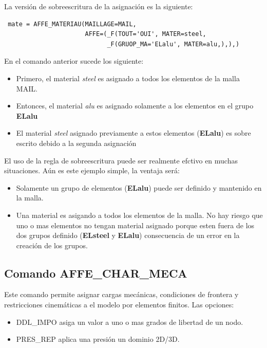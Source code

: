 \documentclass[12pt]{book}
\theoremstyle{definition}
\theoremstyle{remark}
\theoremstyle{plain}
\begin{document}
La versión de sobreescritura de la asignación es la siguiente:

\begin{verbatim}
 mate = AFFE_MATERIAU(MAILLAGE=MAIL, 
                      AFFE=(_F(TOUT='OUI', MATER=steel,
                            _F(GRUOP_MA='ELalu', MATER=alu,),),)
\end{verbatim}

En el comando anterior sucede los siguiente:

\begin{itemize}
 \item Primero, el material \textit{steel} es asignado a todos los elementos de 
la malla MAIL.
 \item Entonces, el material \textit{alu} es asignado solamente a los elementos
en el grupo \textbf{ELalu}
 \item El material \textit{steel} asignado previamente a estos elementos
(\textbf{ELalu}) es sobre escrito debido a la segunda asignación
\end{itemize}

El uso de la regla de sobreescritura puede ser realmente efctivo en muchas 
situaciones. Aún es este ejemplo simple, la ventaja será:

\begin{itemize}
 \item Solamente un grupo de elementos (\textbf{ELalu}) puede ser definido
y mantenido en la malla.
 \item Una material es asigando a todos los elementos de la malla. No hay
riesgo que uno o mas elementos no tengan material asignado porque esten fuera de los
dos grupos definido (\textbf{ELsteel} y \textbf{ELalu}) consecuencia de un error en
la creación de los grupos. 
\end{itemize}

\subsection{Comando AFFE\_CHAR\_MECA}

Este comando permite asignar cargas mecánicas, condiciones de frontera y restricciones
cinemáticas a el modelo por elementos finitos. Las opciones:
\begin{itemize}
 \item DDL\_IMPO asiga un valor a uno o mas grados de libertad de un nodo.
 \item PRES\_REP aplica una presión un dominio 2D/3D.
\end{itemize}
\end{document}
